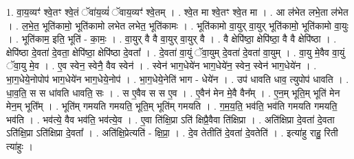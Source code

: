 \documentclass[17pt]{extarticle}
\begin{document}
1. वा॒य॒व्यꣳ॑ श्वे॒तꣳ श्वे॒तं ॅवा॑य॒व्यं॑ ॅवाय॒व्यꣳ॑ श्वे॒तम् । . श्वे॒त मा श्वे॒तꣳ श्वे॒त मा । . आ ल॑भेत लभे॒ता ल॑भेत । . ल॒भे॒त॒ भूति॑कामो॒ भूति॑कामो लभेत लभेत॒ भूति॑कामः । . भूति॑कामो वा॒युर् वा॒युर् भूति॑कामो॒ भूति॑कामो वा॒युः । . भूति॑काम॒ इति॒ भूति॑ - का॒मः॒ । . वा॒युर् वै वै वा॒युर् वा॒युर् वै । . वै क्षेपि॑ष्ठा॒ क्षेपि॑ष्ठा॒ वै वै क्षेपि॑ष्ठा । . क्षेपि॑ष्ठा दे॒वता॑ दे॒वता॒ क्षेपि॑ष्ठा॒ क्षेपि॑ष्ठा दे॒वता᳚ । . दे॒वता॑ वा॒युं ॅवा॒युम् दे॒वता॑ दे॒वता॑ वा॒युम् । . वा॒यु मे॒वैव वा॒युं ॅवा॒यु मे॒व । . ए॒व स्वेन॒ स्वेनै॒ वैव स्वेन॑ । . स्वेन॑ भाग॒धेये॑न भाग॒धेये॑न॒ स्वेन॒ स्वेन॑ भाग॒धेये॑न । . भा॒ग॒धेये॒नोपोप॑ भाग॒धेये॑न भाग॒धेये॒नोप॑ । . भा॒ग॒धेये॒नेति॑ भाग - धेये॑न । . उप॑ धावति धाव॒ त्युपोप॑ धावति । . धा॒व॒ति॒ स स धा॑वति धावति॒ सः । . स ए॒वैव स स ए॒व । . ए॒वैन॑ मेन मे॒वै वैन᳚म् । . ए॒न॒म् भूति॒म् भूति॑ मेन मेन॒म् भूति᳚म् । . भूति॑म् गमयति गमयति॒ भूति॒म् भूति॑म् गमयति । . ग॒म॒य॒ति॒ भव॑ति॒ भव॑ति गमयति गमयति॒ भव॑ति । . भव॑त्ये॒ वैव भव॑ति॒ भव॑त्ये॒व । . ए॒वा ति॑क्षि॒प्रा ऽति॑ क्षिप्रै॒वैवा ति॑क्षिप्रा । . अति॑क्षिप्रा दे॒वता॑ दे॒वता ऽति॑क्षि॒प्रा ऽति॑क्षिप्रा दे॒वता᳚ । . अति॑क्षि॒प्रेत्यति॑ - क्षि॒प्रा॒ । . दे॒व तेतीति॑ दे॒वता॑ दे॒वतेति॑ । . इत्या॑हु राहु॒ रिती त्या॑हुः । \newline
\end{document}
